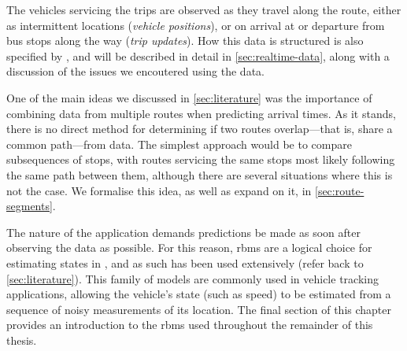 The vehicles servicing the trips are observed as they travel along the route, either as intermittent \GPS{} locations (\emph{vehicle positions}), or on arrival at or departure from bus stops along the way (\emph{trip updates}). How this data is structured is also specified by \GTFS, and will be described in detail in \cref{sec:realtime-data}, along with a discussion of the issues we encoutered using the \AT{} data.


One of the main ideas we discussed in \cref{sec:literature} was the importance of combining data from multiple routes when predicting arrival times. As it stands, there is no direct method for determining if two routes overlap---that is, share a common path---from \GTFS{} data. The simplest approach would be to compare subsequences of stops, with routes servicing the same stops most likely following the same path between them, although there are several situations where this is not the case. We formalise this idea, as well as expand on it, in \cref{sec:route-segments}.


The \rt{} nature of the application demands predictions be made as soon after observing the data as possible. For this reason, \glspl{rbm} are a logical choice for estimating states in \rt{}, and as such has been used extensively (refer back to \cref{sec:literature}). This family of models are commonly used in vehicle tracking applications, allowing the vehicle's state (such as speed) to be estimated from a \rt{} sequence of noisy measurements of its location. The final section of this chapter provides an introduction to the \glspl{rbm} used throughout the remainder of this thesis.








